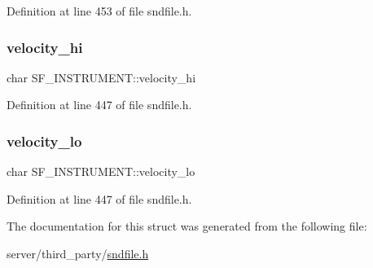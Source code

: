 Definition at line 453 of file sndfile.\+h.

\mbox{\label{struct_s_f___i_n_s_t_r_u_m_e_n_t_a4e1435a98a085a8df95f10ff1bed536f}} 
\subsubsection{\texorpdfstring{velocity\_hi}{velocity\_hi}}
{\footnotesize\ttfamily char S\+F\+\_\+\+I\+N\+S\+T\+R\+U\+M\+E\+N\+T\+::velocity\+\_\+hi}



Definition at line 447 of file sndfile.\+h.

\mbox{\label{struct_s_f___i_n_s_t_r_u_m_e_n_t_a3637643126becba84608741033f91f47}} 
\subsubsection{\texorpdfstring{velocity\_lo}{velocity\_lo}}
{\footnotesize\ttfamily char S\+F\+\_\+\+I\+N\+S\+T\+R\+U\+M\+E\+N\+T\+::velocity\+\_\+lo}



Definition at line 447 of file sndfile.\+h.



The documentation for this struct was generated from the following file\+:\begin{DoxyCompactItemize}
\item 
server/third\+\_\+party/\mbox{\hyperlink{sndfile_8h}{sndfile.\+h}}\end{DoxyCompactItemize}
